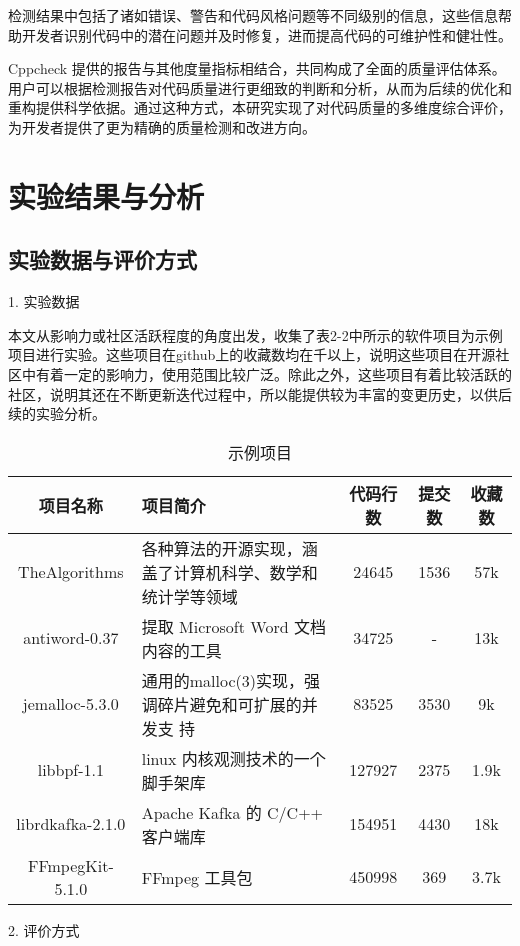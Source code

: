 检测结果中包括了诸如错误、警告和代码风格问题等不同级别的信息，这些信息帮助开发者识别代码中的潜在问题并及时修复，进而提高代码的可维护性和健壮性。

Cppcheck 提供的报告与其他度量指标相结合，共同构成了全面的质量评估体系。用户可以根据检测报告对代码质量进行更细致的判断和分析，从而为后续的优化和重构提供科学依据。通过这种方式，本研究实现了对代码质量的多维度综合评价，为开发者提供了更为精确的质量检测和改进方向。


\section{实验结果与分析}

\subsection{实验数据与评价方式}

1. 实验数据

本文从影响力或社区活跃程度的角度出发，收集了表2-2中所示的软件项目为示例项目进行实验。这些项目在github上的收藏数均在千以上，说明这些项目在开源社区中有着一定的影响力，使用范围比较广泛。除此之外，这些项目有着比较活跃的社区，说明其还在不断更新迭代过程中，所以能提供较为丰富的变更历史，以供后续的实验分析。

\begin{table}[htbp]
\caption{示例项目}
\vspace{0.5em}\centering\wuhao
\begin{tabular}{cp{6cm}ccc}
\toprule
项目名称 & 项目简介 & 代码行数& 提交数 & 收藏数 \\
\midrule
TheAlgorithms & 各种算法的开源实现，涵盖了计算机科学、数学和统计学等领域 & 24645 & 1536 & 57k \\
antiword-0.37 & 提取 Microsoft Word 文档内容的工具 & 34725& - & 13k\\
jemalloc-5.3.0 & 通用的malloc(3)实现，强调碎片避免和可扩展的并发支
持  &83525& 3530 & 9k \\
libbpf-1.1 & linux 内核观测技术的一个脚手架库 & 127927 & 2375 & 1.9k \\
librdkafka-2.1.0& Apache Kafka 的 C/C++ 客户端库 & 154951 & 4430 & 18k \\
FFmpegKit-5.1.0 & FFmpeg 工具包 & 450998 & 369 & 3.7k \\

\bottomrule
\end{tabular}
\end{table}

2. 评价方式

